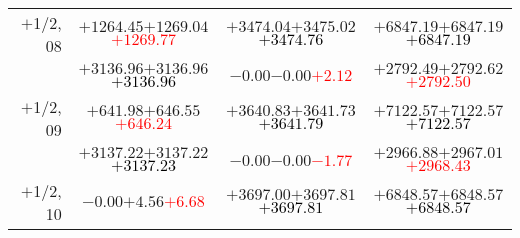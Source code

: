 \documentclass[compress]{beamer}
\begin{document}
\begin{frame}
{\begin{tabular}{r | c | c | c}
$+$1/2, 08 & $+1264.45$\hspace{0.1 cm}$+1269.04$\hspace{0.1 cm}\textcolor{red}{$+1269.77$} & $+3474.04$\hspace{0.1 cm}$+3475.02$\hspace{0.1 cm}\textcolor{black}{$+3474.76$} & $+6847.19$\hspace{0.1 cm}$+6847.19$\hspace{0.1 cm}\textcolor{black}{$+6847.19$} \\
           & $+3136.96$\hspace{0.1 cm}$+3136.96$\hspace{0.1 cm}\textcolor{black}{$+3136.96$} & $-0.00$\hspace{0.1 cm}$-0.00$\hspace{0.1 cm}\textcolor{red}{$+2.12$} & $+2792.49$\hspace{0.1 cm}$+2792.62$\hspace{0.1 cm}\textcolor{red}{$+2792.50$} \\
$+$1/2, 09 & $+641.98$\hspace{0.1 cm}$+646.55$\hspace{0.1 cm}\textcolor{red}{$+646.24$} & $+3640.83$\hspace{0.1 cm}$+3641.73$\hspace{0.1 cm}\textcolor{black}{$+3641.79$} & $+7122.57$\hspace{0.1 cm}$+7122.57$\hspace{0.1 cm}\textcolor{black}{$+7122.57$} \\
           & $+3137.22$\hspace{0.1 cm}$+3137.22$\hspace{0.1 cm}\textcolor{black}{$+3137.23$} & $-0.00$\hspace{0.1 cm}$-0.00$\hspace{0.1 cm}\textcolor{red}{$-1.77$} & $+2966.88$\hspace{0.1 cm}$+2967.01$\hspace{0.1 cm}\textcolor{red}{$+2968.43$} \\
$+$1/2, 10 & $-0.00$\hspace{0.1 cm}$+4.56$\hspace{0.1 cm}\textcolor{red}{$+6.68$} & $+3697.00$\hspace{0.1 cm}$+3697.81$\hspace{0.1 cm}\textcolor{black}{$+3697.81$} & $+6848.57$\hspace{0.1 cm}$+6848.57$\hspace{0.1 cm}\textcolor{black}{$+6848.57$} \\

\end{tabular}}
\end{frame}
\end{document}

